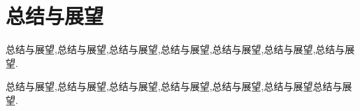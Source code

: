 
	\section{总结与展望}	
	\par 
	总结与展望,总结与展望,总结与展望,总结与展望,总结与展望,总结与展望,总结与展望.
	\par 
	总结与展望,总结与展望,总结与展望,总结与展望,总结与展望,总结与展望总结与展望.
		
		